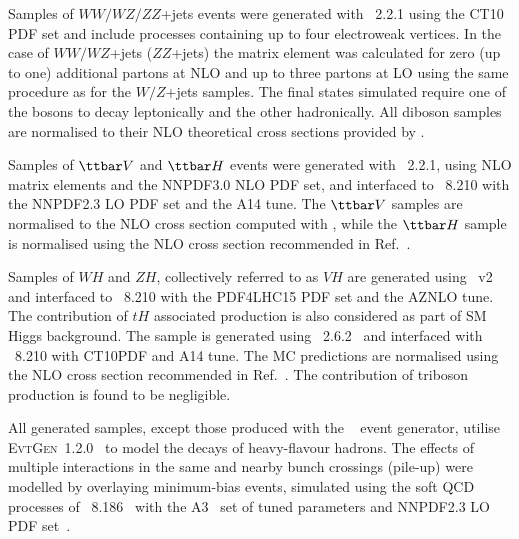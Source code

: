 Samples of $WW/WZ/ZZ$+jets events were generated with {\sherpa}~2.2.1 using the CT10 PDF set
and include processes containing up to four electroweak vertices. 
In the case of $WW/WZ$+jets ($ZZ$+jets) the matrix element was calculated for zero (up to one) additional partons 
at NLO and up to three partons at LO using the same procedure as for the $W/Z$+jets samples. 
The final states simulated require one of the bosons to decay leptonically and the other hadronically.
All diboson samples are normalised to their NLO theoretical cross sections provided by {\sherpa}. 

Samples of $\ttbar V$ and $\ttbar H$ events were generated with {\amcatnlo}~2.2.1, using NLO matrix elements and the NNPDF3.0 NLO PDF set,
and interfaced to {\pythia}~8.210 with the NNPDF2.3 LO PDF set and the A14 tune. 
The $\ttbar V$ samples are normalised to the NLO cross section computed with {\amcatnlo}, while the $\ttbar H$ sample is normalised using 
the NLO cross section recommended in Ref.~\cite{deFlorian:2016spz}.

Samples of $WH$ and $ZH$, collectively referred to as $VH$ are generated using {\powheg}~v2 \cite{Frixione:2007nw,Nason:2004rx,Frixione:2007vw,Alioli:2010xd}
and interfaced to {\pythia}~8.210 with the PDF4LHC15 PDF set and the AZNLO tune.
The contribution of $tH$ associated production is also considered as part of SM Higgs background.
The sample is generated using {\amcatnlolong}~2.6.2~\cite{Alwall:2014hca} and interfaced with {\pythia}~8.210 with CT10PDF
and A14 tune. The MC predictions are normalised using the NLO cross section recommended in Ref.~\cite{deFlorian:2016spz}.
The contribution of triboson production is found to be negligible.

All generated samples, except those produced with the {\sherpa}~\cite{Gleisberg:2008ta} event generator, 
utilise \textsc{EvtGen}~1.2.0~\cite{Lange:2001uf} to model the decays of heavy-flavour hadrons. 
The effects of multiple interactions in the same and nearby bunch crossings (pile-up) were modelled by overlaying minimum-bias events, simulated using the soft QCD processes of {\pythia}~8.186~\cite{Sjostrand:2006za} with the A3~\cite{ATL-PHYS-PUB-2016-017} set of tuned parameters and NNPDF2.3 LO PDF set~\cite{Ball:2012cx}.

